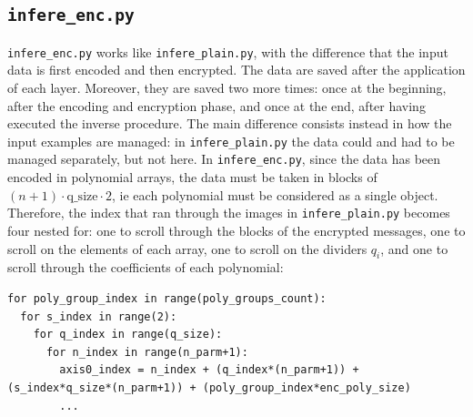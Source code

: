 \subsection{\texttt{infere_enc.py}}

\texttt{infere_enc.py} works like \texttt{infere_plain.py}, with the difference that the input data is first encoded and then encrypted. The data are saved after the application of each layer. Moreover, they are saved two more times: once at the beginning, after the encoding and encryption phase, and once at the end, after having executed the inverse procedure. The main difference consists instead in how the input examples are managed: in \texttt{infere_plain.py} the data could and had to be managed separately, but not here. In \texttt{infere_enc.py}, since the data has been encoded in polynomial arrays, the data must be taken in blocks of $(n+1)\cdot\text{q_size}\cdot2$, ie each polynomial must be considered as a single object. Therefore, the index that ran through the images in \texttt{infere_plain.py} becomes four nested for: one to scroll through the blocks of the encrypted messages, one to scroll on the elements of each array, one to scroll on the dividers $q_i$, and one to scroll through the coefficients of each polynomial:

\begin{lstlisting}[frame=single]
for poly_group_index in range(poly_groups_count):
  for s_index in range(2):
    for q_index in range(q_size):
      for n_index in range(n_parm+1):
        axis0_index = n_index + (q_index*(n_parm+1)) + (s_index*q_size*(n_parm+1)) + (poly_group_index*enc_poly_size)
        ...
\end{lstlisting}


